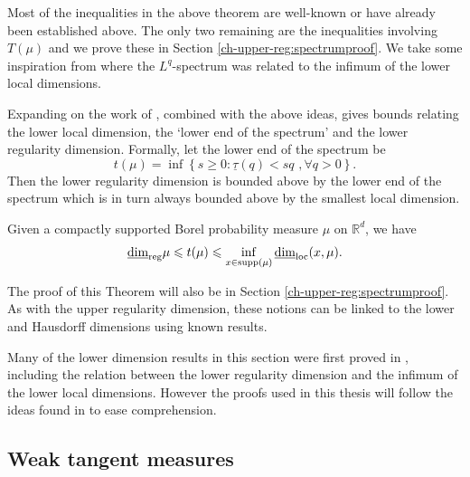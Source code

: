 Most of the inequalities in the above theorem are well-known or have already been established above.  The only two remaining are the inequalities involving $T(\mu)$ and we prove these in Section \ref{ch-upper-reg:spectrumproof}. We take some inspiration from \cite{fraser-jordan} where the $L^q$-spectrum was related to the infimum of the lower local dimensions.


Expanding on the work of \cite{fraser-jordan}, combined with the above ideas, gives bounds relating the lower local dimension, the `lower end of the spectrum' and the lower regularity dimension. Formally, let the lower end of the spectrum be
\[
t(\mu) = \inf\left\{ s \ge 0 \colon \underline{\tau}(q) < sq  \, \,, \forall q>0 \right\}.
\]
Then the lower regularity dimension is bounded above by the lower end of the spectrum which is in turn always bounded above by the smallest local dimension.

\begin{theorem} \label{ch-upper-reg:lower-relationships}
	Given a compactly supported Borel probability measure $\mu$ on $\mathbb{R}^d$, we have
	\[
    \underline{\dim}_{\textup{reg}} \mu  \leqslant  t(\mu)  \leqslant  \inf_ {x\in \mathrm{supp}(\mu)}  \underline{\dim}_{\mathrm{loc}}(x,\mu).
    \]
\end{theorem}
The proof of this Theorem will also be in Section \ref{ch-upper-reg:spectrumproof}. As with the upper regularity dimension, these notions can be linked to the lower and Hausdorff dimensions using known results. 

Many of the lower dimension results in this section were first proved in \cite{hare-troscheit}, including the relation between the lower regularity dimension and the infimum of the lower local dimensions. However the proofs used in this thesis will follow the ideas found in \cite{fraser-howroyd2} to ease comprehension.




\subsection{Weak tangent measures}\label{ch-upper-reg:sec:tangent}


